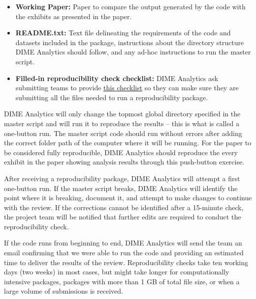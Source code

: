 \begin{fullwidth}
	\begin{itemize}
		\setlength\itemsep{-0.1em}
		\item \textbf{Working Paper:} Paper to compare the output generated by the code with the exhibits as presented in the paper.
		\item \textbf{README.txt:} Text file delineating the requirements of the code and datasets included in the package, instructions about the directory structure DIME Analytics should follow, and any ad-hoc instructions to run the master script.
		\item \textbf{Filled-in reproducibility check checklist:} DIME Analytics ask submitting teams to provide \href{https://raw.githubusercontent.com/worldbank/dime-standards/master/dime-research-standards/pillar-3-research-reproducibility/checklists/Reproducibility%20package%20submission%20checklist.pdf}{this checklist} so they can make sure they are submitting all the files needed to run a reproducibility package.
	\end{itemize}

	DIME Analytics will only change the topmost global directory specified in the master script and will run it to reproduce the results – this is what is called a one-button run. The master script code should run without errors after adding the correct folder path of the computer where it will be running. For the paper to be considered fully reproducible, DIME Analytics should reproduce the every exhibit in the paper showing analysis results through this push-button exercise.

	\bigskip

	After receiving a reproducibility package, DIME Analytics will attempt a first one-button run. If the master script breaks, DIME Analytics will identify the point where it is breaking, document it, and attempt to make changes to continue with the review. If the corrections cannot be identified after a 15-minute check, the project team will be notified that further edits are required to conduct the reproducibility check.

	\bigskip

	If the code runs from beginning to end, DIME Analytics will send the team an email confirming that we were able to run the code and providing an estimated time to deliver the results of the review. Reproducibility checks take ten working days (two weeks) in most cases, but might take longer for computationally intensive packages, packages with more than 1 GB of total file size, or when a large volume of submissions is received.


\end{fullwidth}
